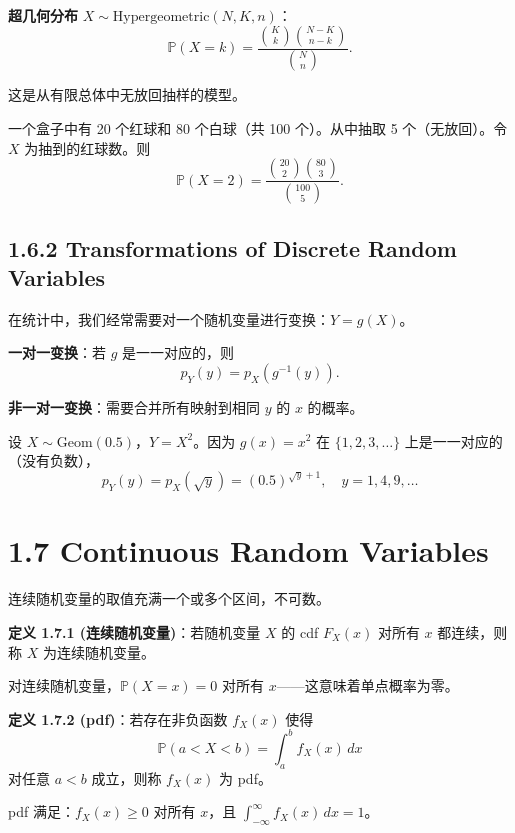 \textbf{超几何分布} $X \sim \text{Hypergeometric}(N, K, n)$：
\[
\mathbb{P}(X = k) = \frac{\binom{K}{k}\binom{N-K}{n-k}}{\binom{N}{n}}.
\label{eq:hypergeometric-ch1}
\]

这是从有限总体中无放回抽样的模型。

\begin{example}[超几何分布]\label{ex:hypergeometric-ch1}
一个盒子中有 20 个红球和 80 个白球（共 100 个）。从中抽取 5 个（无放回）。令 $X$ 为抽到的红球数。则
\[
\mathbb{P}(X = 2) = \frac{\binom{20}{2}\binom{80}{3}}{\binom{100}{5}}.
\]
\end{example}

\subsection{1.6.2 Transformations of Discrete Random Variables}

在统计中，我们经常需要对一个随机变量进行变换：$Y = g(X)$。

\textbf{一对一变换}：若 $g$ 是一一对应的，则
\[
p_Y(y) = p_X(g^{-1}(y)).
\label{eq:discrete-one-to-one-ch1}
\]

\textbf{非一对一变换}：需要合并所有映射到相同 $y$ 的 $x$ 的概率。

\begin{example}[离散变换]\label{ex:discrete-transform-ch1}
设 $X \sim \text{Geom}(0.5)$，$Y = X^2$。因为 $g(x) = x^2$ 在 $\{1, 2, 3, \ldots\}$ 上是一一对应的（没有负数），
\[
p_Y(y) = p_X(\sqrt{y}) = (0.5)^{\sqrt{y}+1}, \quad y = 1, 4, 9, \ldots
\]
\end{example}

\section{1.7 Continuous Random Variables}\label{sec:1.7}

连续随机变量的取值充满一个或多个区间，不可数。

\begin{remark}
\textbf{定义 1.7.1 (连续随机变量)}：若随机变量 $X$ 的 cdf $F_X(x)$ 对所有 $x$ 都连续，则称 $X$ 为连续随机变量。
\end{remark}

对连续随机变量，$\mathbb{P}(X = x) = 0$ 对所有 $x$——这意味着单点概率为零。

\begin{remark}
\textbf{定义 1.7.2 (pdf)}：若存在非负函数 $f_X(x)$ 使得
\[
\mathbb{P}(a < X < b) = \int_a^b f_X(x) \, dx
\]
对任意 $a < b$ 成立，则称 $f_X(x)$ 为 pdf。

pdf 满足：$f_X(x) \geq 0$ 对所有 $x$，且 $\int_{-\infty}^{\infty} f_X(x) \, dx = 1$。
\end{remark}

